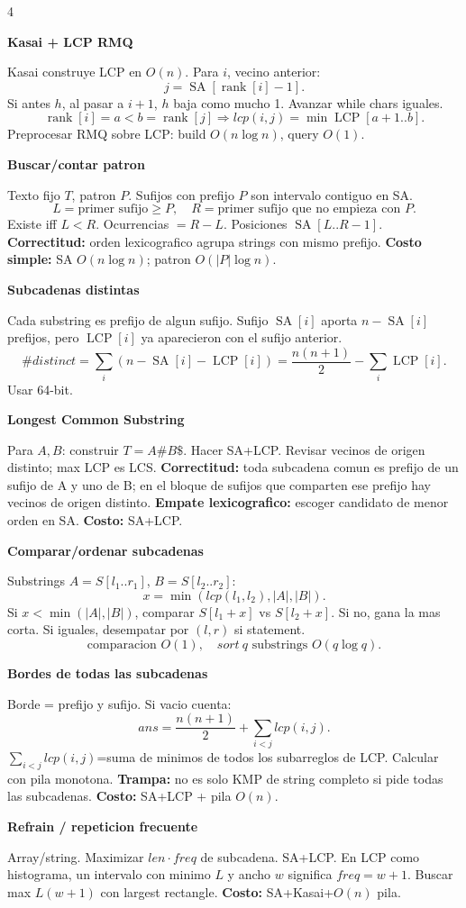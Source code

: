 \documentclass[8pt]{extarticle}
\newcommand{\blk}[2]{%
  \vspace{1.3pt}
  \noindent\colorbox{head}{\parbox{\linewidth-2\fboxsep}{\textbf{#1}}}\par
  {\footnotesize #2}\par
}
\newcommand{\bigO}{O}
\newcommand{\SA}{\operatorname{SA}}
\newcommand{\LCP}{\operatorname{LCP}}
\newcommand{\rankv}{\operatorname{rank}}
\begin{document}
\begin{multicols}{4}
\blk{Kasai + LCP RMQ}{
Kasai construye LCP en \(\bigO(n)\). Para \(i\), vecino anterior:
\[
j=\SA[\rankv[i]-1].
\]
Si antes \(h\), al pasar a \(i+1\), \(h\) baja como mucho 1. Avanzar while chars iguales.
\[
\rankv[i]=a<b=\rankv[j]\Rightarrow
lcp(i,j)=\min \LCP[a+1..b].
\]
Preprocesar RMQ sobre LCP: build \(\bigO(n\log n)\), query \(\bigO(1)\).}

\blk{Buscar/contar patron}{
Texto fijo \(T\), patron \(P\). Sufijos con prefijo \(P\) son intervalo contiguo en SA.
\[
L=\text{primer sufijo}\ge P,\quad R=\text{primer sufijo que no empieza con }P.
\]
Existe iff \(L<R\). Ocurrencias \(=R-L\). Posiciones \(\SA[L..R-1]\).
\textbf{Correctitud:} orden lexicografico agrupa strings con mismo prefijo.
\textbf{Costo simple:} SA \(\bigO(n\log n)\); patron \(\bigO(|P|\log n)\).}

\blk{Subcadenas distintas}{
Cada substring es prefijo de algun sufijo. Sufijo \(\SA[i]\) aporta \(n-\SA[i]\) prefijos, pero \(\LCP[i]\) ya aparecieron con el sufijo anterior.
\[
\#distinct=\sum_i(n-\SA[i]-\LCP[i])
=\frac{n(n+1)}2-\sum_i\LCP[i].
\]
Usar 64-bit.}

\blk{Longest Common Substring}{
Para \(A,B\): construir \(T=A\#B\$\). Hacer SA+LCP. Revisar vecinos de origen distinto; max LCP es LCS.
\textbf{Correctitud:} toda subcadena comun es prefijo de un sufijo de A y uno de B; en el bloque de sufijos que comparten ese prefijo hay vecinos de origen distinto.
\textbf{Empate lexicografico:} escoger candidato de menor orden en SA.
\textbf{Costo:} SA+LCP.}

\blk{Comparar/ordenar subcadenas}{
Substrings \(A=S[l_1..r_1]\), \(B=S[l_2..r_2]\):
\[
x=\min(lcp(l_1,l_2), |A|, |B|).
\]
Si \(x<\min(|A|,|B|)\), comparar \(S[l_1+x]\) vs \(S[l_2+x]\). Si no, gana la mas corta. Si iguales, desempatar por \((l,r)\) si statement.
\[
\text{comparacion } \bigO(1),\quad sort\ q\text{ substrings } \bigO(q\log q).
\]}

\blk{Bordes de todas las subcadenas}{
Borde = prefijo y sufijo. Si vacio cuenta:
\[
ans=\frac{n(n+1)}2+\sum_{i<j}lcp(i,j).
\]
\(\sum_{i<j}lcp(i,j)\)=suma de minimos de todos los subarreglos de LCP. Calcular con pila monotona.
\textbf{Trampa:} no es solo KMP de string completo si pide todas las subcadenas.
\textbf{Costo:} SA+LCP + pila \(\bigO(n)\).}

\blk{Refrain / repeticion frecuente}{
Array/string. Maximizar \(len\cdot freq\) de subcadena. SA+LCP. En LCP como histograma, un intervalo con minimo \(L\) y ancho \(w\) significa \(freq=w+1\). Buscar max \(L(w+1)\) con largest rectangle.
\textbf{Costo:} SA+Kasai+\(\bigO(n)\) pila.}


\end{multicols}
\end{document}
